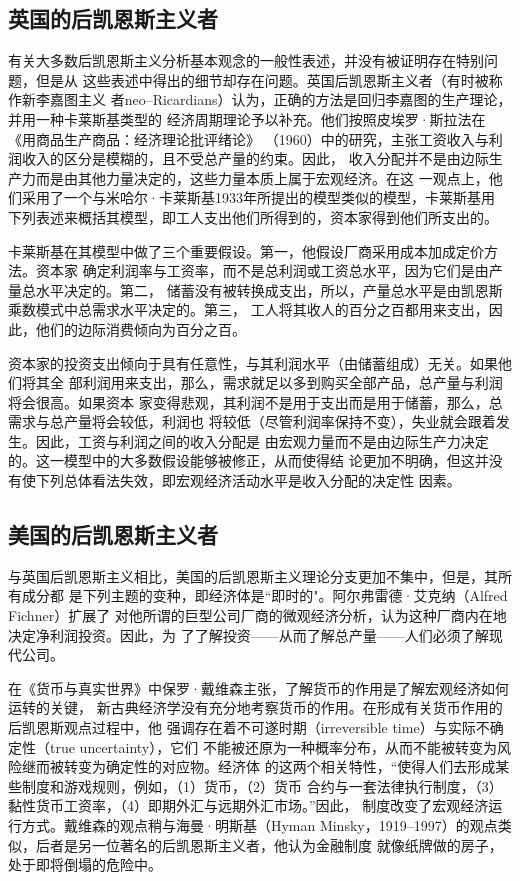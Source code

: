 \subsection{英国的后凯恩斯主义者}

有关大多数后凯恩斯主义分析基本观念的一般性表述，并没有被证明存在特别问题，但是从
这些表述中得出的细节却存在问题。英国后凯恩斯主义者（有时被称作新李嘉图主义
者neo--Ricardians）认为，正确的方法是回归李嘉图的生产理论，并用一种卡莱斯基类型的
经济周期理论予以补充。他们按照皮埃罗·斯拉法在《用商品生产商品：经济理论批评绪论》
（1960）中的研究，主张工资收入与利润收入的区分是模糊的，且不受总产量的约束。因此，
收入分配并不是由边际生产力而是由其他力量决定的，这些力量本质上属于宏观经济。在这
一观点上，他们采用了一个与米哈尔·卡莱斯基1933年所提出的模型类似的模型，卡莱斯基用
下列表述来概括其模型，即工人支出他们所得到的，资本家得到他们所支出的。

卡莱斯基在其模型中做了三个重要假设。第一，他假设厂商采用成本加成定价方法。资本家
确定利润率与工资率，而不是总利润或工资总水平，因为它们是由产量总水平决定的。第二，
储蓄没有被转换成支出，所以，产量总水平是由凯恩斯乘数模式中总需求水平决定的。第三，
工人将其收人的百分之百都用来支出，因此，他们的边际消费倾向为百分之百。

资本家的投资支出倾向于具有任意性，与其利润水平（由储蓄组成）无关。如果他们将其全
部利润用来支出，那么，需求就足以多到购买全部产品，总产量与利润将会很高。如果资本
家变得悲观，其利润不是用于支出而是用于储蓄，那么，总需求与总产量将会较低，利润也
将较低（尽管利润率保持不变），失业就会跟着发生。因此，工资与利润之间的收入分配是
由宏观力量而不是由边际生产力决定的。这一模型中的大多数假设能够被修正，从而使得结
论更加不明确，但这并没有使下列总体看法失效，即宏观经济活动水平是收入分配的决定性
因素。
\clearpage
\subsection{美国的后凯恩斯主义者}

与英国后凯恩斯主义相比，美国的后凯恩斯主义理论分支更加不集中，但是，其所有成分都
是下列主题的变种，即经济体是“即时的"。阿尔弗雷德·艾克纳（Alfred Fichner）扩展了
对他所谓的巨型公司厂商的微观经济分析，认为这种厂商内在地决定净利润投资。因此，为
了了解投资——从而了解总产量——人们必须了解现代公司。

在《货币与真实世界》中保罗·戴维森主张，了解货币的作用是了解宏观经济如何运转的关键，
新古典经济学没有充分地考察货币的作用。在形成有关货币作用的后凯恩斯观点过程中，他
强调存在着不可遂时期（irreversible time）与实际不确定性（true uncertainty），它们
不能被还原为一种概率分布，从而不能被转变为风险继而被转变为确定性的对应物。经济体
的这两个相关特性，“使得人们去形成某些制度和游戏规则，例如，（1）货币，（2）货币
合约与一套法律执行制度，（3）黏性货币工资率，（4）即期外汇与远期外汇市场。”因此，
制度改变了宏观经济运行方式。戴维森的观点稍与海曼·明斯基（Hyman
Minsky，1919--1997）的观点类似，后者是另一位著名的后凯恩斯主义者，他认为金融制度
就像纸牌做的房子，处于即将倒塌的危险中。

